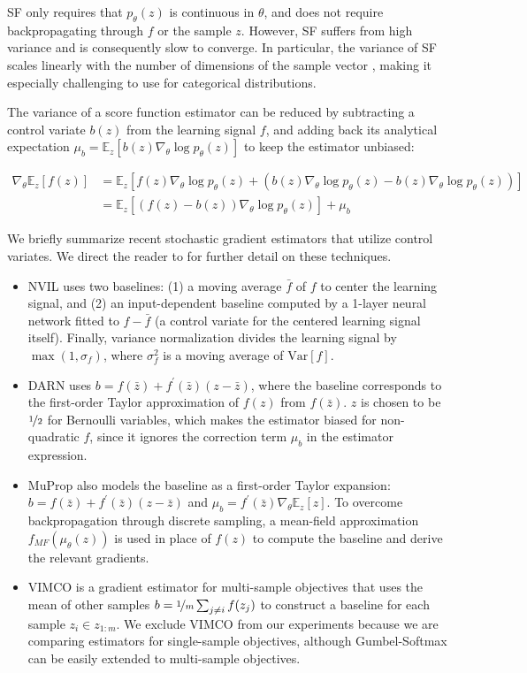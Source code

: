 \documentclass{article} %
\begin{document}
SF only requires that $p_\theta(z)$ is continuous in $\theta$, and does not require backpropagating through $f$ or the sample $z$. However, SF suffers from high variance and is consequently slow to converge. In particular, the variance of SF scales linearly with the number of dimensions of the sample vector \citep{2014arXiv1401.4082J}, making it especially challenging to use for categorical distributions.

The variance of a score function estimator can be reduced by subtracting a control variate $b(z)$ from the learning signal $f$, and adding back its analytical expectation $\mu_b = \mathbb{E}_z\left[b(z)\nabla_\theta \log p_\theta(z)\right]$ to keep the estimator unbiased:

\begin{align}
\nabla_\theta \mathbb{E}_{z}\left[f(z)\right] & = \mathbb{E}_z\left[f(z)\nabla_\theta \log p_\theta(z) + (b(z)\nabla_\theta \log p_\theta(z)- b(z)\nabla_\theta \log p_\theta(z))\right] \\
& =\mathbb{E}_z\left[(f(z)- b(z))\nabla_\theta \log p_\theta(z)\right] + \mu_b
\end{align}

We briefly summarize recent stochastic gradient estimators that utilize control variates. We direct the reader to \citet{gu2016} for further detail on these techniques.

\begin{itemize}
\item NVIL \citep{NVIL} uses two baselines: (1) a moving average $\bar{f}$ of $f$ to center the learning signal, and (2) an input-dependent baseline computed by a 1-layer neural network fitted to $f - \bar{f}$ (a control variate for the centered learning signal itself). Finally, variance normalization divides the learning signal by $\max (1,\sigma_f)$, where $\sigma_f^2$ is a moving average of $\text{Var}[f]$. 
\item DARN \citep{DARN} uses $b=f(\bar{z})+f^\prime(\bar{z})(z-\bar{z})$, where the baseline corresponds to the first-order Taylor approximation of $f(z)$ from $f(\bar{z})$. $z$ is chosen to be $\nicefrac{1}{2}$ for Bernoulli variables, which makes the estimator biased for non-quadratic $f$, since it ignores the correction term $\mu_b$ in the estimator expression.
\item MuProp \citep{gu2016} also models the baseline as a first-order Taylor expansion: $b=f(\bar{z})+f^\prime(\bar{z})(z-\bar{z})$ and $\mu_b = f^\prime(\bar{z})\nabla_\theta \mathbb{E}_z\left[z\right]$. To overcome backpropagation through discrete sampling, a mean-field approximation $f_{MF}(\mu_\theta(z))$ is used in place of $f(z)$ to compute the baseline and derive the relevant gradients.
\item VIMCO \citep{VIMCO} is a gradient estimator for multi-sample objectives that uses the mean of other samples $b = \nicefrac{1}{m}\sum_{j\neq i} f(z_j)$ to construct a baseline for each sample $z_i \in z_{1:m}$. We exclude VIMCO from our experiments because we are comparing estimators for single-sample objectives, although Gumbel-Softmax can be easily extended to multi-sample objectives.
\end{itemize} 
\end{document}
